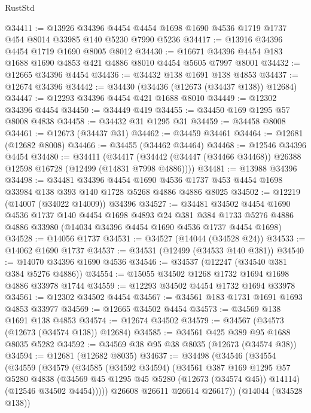 \begin{lexlean}{RustStd}
\begin{coremodule}
{\begin{coremodule}
{{{{{{{{{{{{{{{{{{{{{{{{{{{{{{{{{{{{{{{{{{{{{{{{{{{{{{{{{{{{{{{{{{{{{{{{{{{{{{{{@34411 := @13926
    @34396
    @4454
    @4454
    @1698
    @1690
    @4536
    @1719
    @1737
    @454
    @8014
    @33985
    @140
    @5230
    @7990
    @5236
@34417 := @13916 @34396 @4454 @1719 @1690 @8005 @8012
@34430 := @16671 @34396 @4454 @183 @1688 @1690 @4853 @421 @4886 @8010 @4454 @5605 @7997 @8001
@34432 := @12665 @34396 @4454
@34436 := @34432 @138 @1691 @138 @4853
@34437 := @12674 @34396
@34442 := @34430 (@34436 (@12673 (@34437 @138)) @12684)
@34447 := @12293 @34396 @4454 @421 @1688 @8010
@34449 := @12302 @34396 @4454
@34450 := @34449 @419
@34455 := @34450 @169 @1295 @57 @8008 @4838
@34458 := @34432 @31 @1295 @31
@34459 := @34458 @8008
@34461 := @12673 (@34437 @31)
@34462 := @34459 @34461
@34464 := @12681 (@12682 @8008)
@34466 := @34455 (@34462 @34464)
@34468 := @12546 @34396 @4454
@34480 := @34411
    (@34417 (@34442 (@34447 (@34466 @34468)) @26388 @12598 @16728 (@12499 (@14831 @7998 @4886))))
@34481 := @13988 @34396
@34498 := @34481
    @34396
    @4454
    @1690
    @4536
    @1737
    @453
    @4454
    @1698
    @33984
    @138
    @393
    @140
    @1728
    @5268
    @4886
    @4886
    @8025
@34502 := @12219 (@14007 (@34022 @14009)) @34396
@34527 := @34481
    @34502
    @4454
    @1690
    @4536
    @1737
    @140
    @4454
    @1698
    @4893
    @24
    @381
    @384
    @1733
    @5276
    @4886
    @4886
    @33980
    (@14034 @34396 @4454 @1690 @4536 @1737 @4454 @1698)
@34528 := @14056 @1737
@34531 := @34527 (@14044 (@34528 @24))
@34533 := @14062 @1690 @1737
@34537 := @34531 (@12499 (@34533 @140 @381))
@34540 := @14070 @34396 @1690 @4536
@34546 := @34537 (@12247 (@34540 @381 @384 @5276 @4886))
@34554 := @15055 @34502 @1268 @1732 @1694 @1698 @4886 @33978 @1744
@34559 := @12293 @34502 @4454 @1732 @1694 @33978
@34561 := @12302 @34502 @4454
@34567 := @34561 @183 @1731 @1691 @1693 @4853 @33977
@34569 := @12665 @34502 @4454
@34573 := @34569 @138 @1691 @138 @4853
@34574 := @12674 @34502
@34579 := @34567 (@34573 (@12673 (@34574 @138)) @12684)
@34585 := @34561 @425 @389 @95 @1688 @8035 @5282
@34592 := @34569 @38 @95 @38 @8035 (@12673 (@34574 @38))
@34594 := @12681 (@12682 @8035)
@34637 := @34498
    (@34546
      (@34554
        (@34559
          (@34579
            (@34585
              (@34592 @34594)
              (@34561
                @387
                @169
                @1295
                @57
                @5280
                @4838
                (@34569 @45 @1295 @45 @5280 (@12673 (@34574 @45)) @14114)
                (@12546 @34502 @4454)))))
        @26608
        @26611
        @26614
        @26617))
    (@14044 (@34528 @138))
}}}}}}}}}}}}}}}}}}}}}}}}}}}}}}}}}}}}}}}}}}}}}}}}}}}}}}}}}}}}}}}}}}}}}}}}}}}}}}}}
\end{coremodule}}
\end{coremodule}
\end{lexlean}
